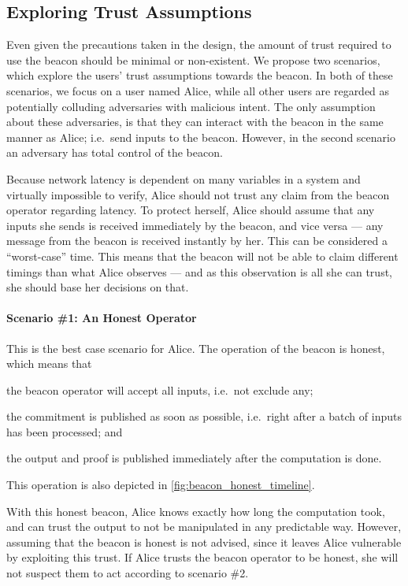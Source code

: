 \subsection{Exploring Trust Assumptions}%
\label{sub:trusting_the_beacon}

Even given the precautions taken in the design, the amount of trust required to use the beacon should be minimal or non-existent.
We propose two scenarios, which explore the users' trust assumptions towards the beacon.
In both of these scenarios, we focus on a user named Alice, while all other users are regarded as potentially colluding adversaries with malicious intent.
The only assumption about these adversaries, is that they can interact with the beacon in the same manner as Alice; i.e.\ send inputs to the beacon.
However, in the second scenario an adversary has total control of the beacon.

Because network latency is dependent on many variables in a system and virtually impossible to verify, Alice should not trust any claim from the beacon operator regarding latency.
To protect herself, Alice should assume that any inputs she sends is received immediately by the beacon, and vice versa --- any message from the beacon is received instantly by her. This can be considered a \enquote{worst-case} time.
This means that the beacon will not be able to claim different timings than what Alice observes --- and as this observation is all she can trust, she should base her decisions on that.

\paragraph{Scenario \#1: An Honest Operator}
This is the best case scenario for Alice.
The operation of the beacon is honest, which means that
\begin{eletterate*}
\item the beacon operator will accept all inputs, i.e.\ not exclude any;
\item the commitment is published as soon as possible, i.e.\ right after a batch of inputs has been processed; and
\item the output and proof is published immediately after the computation is done.
\end{eletterate*}
This operation is also depicted in \cref{fig:beacon_honest_timeline}.

With this honest beacon, Alice knows exactly how long the computation took, and can trust the output to not be manipulated in any predictable way.
However, assuming that the beacon is honest is not advised, since it leaves Alice vulnerable by exploiting this trust.
If Alice trusts the beacon operator to be honest, she will not suspect them to act according to scenario \#2.

